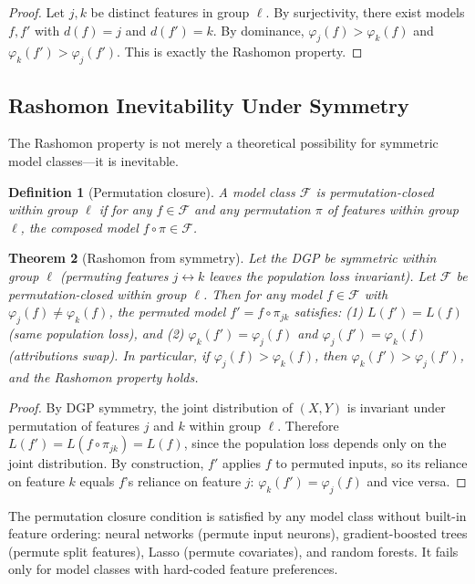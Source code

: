 \documentclass{article}
\newtheorem{theorem}{Theorem}
\newtheorem{definition}[theorem]{Definition}
\begin{document}
\begin{proof}
Let $j, k$ be distinct features in group $\ell$.
By surjectivity, there exist models $f, f'$ with $d(f) = j$ and $d(f') = k$.
By dominance, $\varphi_j(f) > \varphi_k(f)$ and $\varphi_k(f') > \varphi_j(f')$.
This is exactly the Rashomon property.
\end{proof}

\subsection{Rashomon Inevitability Under Symmetry}
\label{sec:rashomon-inevitability}

The Rashomon property is not merely a theoretical possibility for symmetric model classes---it is inevitable.

\begin{definition}[Permutation closure]
\label{def:perm-closure}
A model class $\mathcal{F}$ is \emph{permutation-closed} within group $\ell$ if for any $f \in \mathcal{F}$ and any permutation $\pi$ of features within group $\ell$, the composed model $f \circ \pi \in \mathcal{F}$.
\end{definition}

\begin{theorem}[Rashomon from symmetry]
\label{thm:rashomon-symmetry}
Let the DGP be symmetric within group $\ell$ (permuting features $j \leftrightarrow k$ leaves the population loss invariant). Let $\mathcal{F}$ be permutation-closed within group $\ell$. Then for any model $f \in \mathcal{F}$ with $\varphi_j(f) \neq \varphi_k(f)$, the permuted model $f' = f \circ \pi_{jk}$ satisfies: (1) $L(f') = L(f)$ (same population loss), and (2) $\varphi_k(f') = \varphi_j(f)$ and $\varphi_j(f') = \varphi_k(f)$ (attributions swap).
In particular, if $\varphi_j(f) > \varphi_k(f)$, then $\varphi_k(f') > \varphi_j(f')$, and the Rashomon property holds.
\end{theorem}

\begin{proof}
By DGP symmetry, the joint distribution of $(X, Y)$ is invariant under permutation of features $j$ and $k$ within group $\ell$. Therefore $L(f') = L(f \circ \pi_{jk}) = L(f)$, since the population loss depends only on the joint distribution. By construction, $f'$ applies $f$ to permuted inputs, so its reliance on feature $k$ equals $f$'s reliance on feature $j$: $\varphi_k(f') = \varphi_j(f)$ and vice versa.
\end{proof}

The permutation closure condition is satisfied by any model class without built-in feature ordering: neural networks (permute input neurons), gradient-boosted trees (permute split features), Lasso (permute covariates), and random forests. It fails only for model classes with hard-coded feature preferences.
\end{document}
